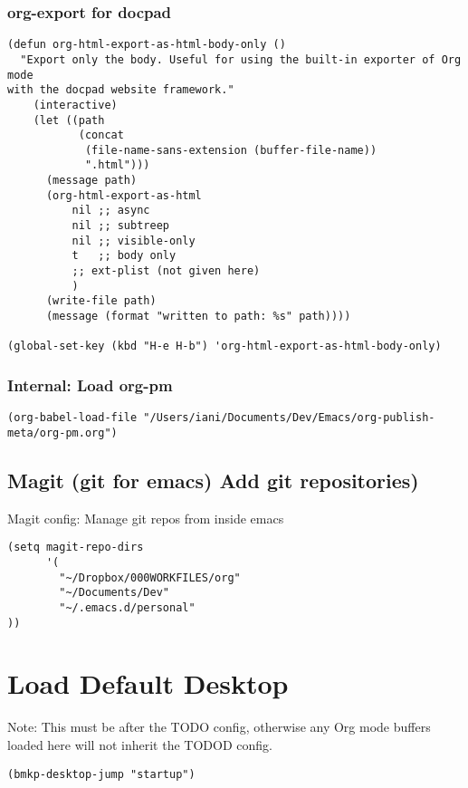 \documentclass[nofonts]{tufte-handout}
\begin{document}
\subsubsection{org-export for docpad}
\label{sec-2-5-20}
\begin{verbatim}
(defun org-html-export-as-html-body-only ()
  "Export only the body. Useful for using the built-in exporter of Org mode
with the docpad website framework."
    (interactive)
    (let ((path
           (concat
            (file-name-sans-extension (buffer-file-name))
            ".html")))
      (message path)
      (org-html-export-as-html
          nil ;; async
          nil ;; subtreep
          nil ;; visible-only
          t   ;; body only
          ;; ext-plist (not given here)
          )
      (write-file path)
      (message (format "written to path: %s" path))))

(global-set-key (kbd "H-e H-b") 'org-html-export-as-html-body-only)
\end{verbatim}
\subsubsection{Internal: Load org-pm}
\label{sec-2-5-21}

\begin{verbatim}
(org-babel-load-file "/Users/iani/Documents/Dev/Emacs/org-publish-meta/org-pm.org")
\end{verbatim}

\subsection{Magit (git for emacs) Add git repositories)}
\label{sec-2-6}

Magit config: Manage git repos from inside emacs

\begin{verbatim}
(setq magit-repo-dirs
      '(
        "~/Dropbox/000WORKFILES/org"
        "~/Documents/Dev"
        "~/.emacs.d/personal"
))
\end{verbatim}


\section{Load Default Desktop}
\label{sec-3}

Note: This must be after the TODO config, otherwise any Org mode buffers loaded here will not inherit the TODOD config.

\begin{verbatim}
(bmkp-desktop-jump "startup")
\end{verbatim}
\end{document}
